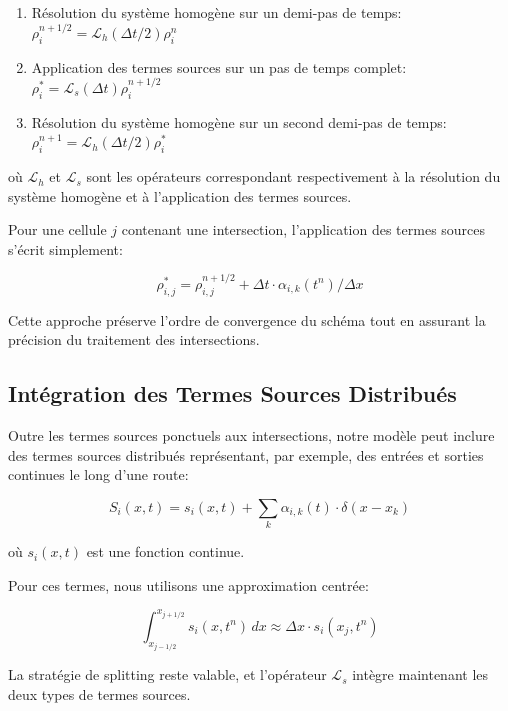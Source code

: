 \begin{enumerate}
\item Résolution du système homogène sur un demi-pas de temps: $\rho_i^{n+1/2} = \mathcal{L}_h(\Delta t/2) \rho_i^n$
\item Application des termes sources sur un pas de temps complet: $\rho_i^{*} = \mathcal{L}_s(\Delta t) \rho_i^{n+1/2}$
\item Résolution du système homogène sur un second demi-pas de temps: $\rho_i^{n+1} = \mathcal{L}_h(\Delta t/2) \rho_i^{*}$
\end{enumerate}

où $\mathcal{L}_h$ et $\mathcal{L}_s$ sont les opérateurs correspondant respectivement à la résolution du système homogène et à l'application des termes sources.

Pour une cellule $j$ contenant une intersection, l'application des termes sources s'écrit simplement:

\begin{equation}
\rho_{i,j}^{*} = \rho_{i,j}^{n+1/2} + \Delta t \cdot \alpha_{i,k}(t^n) / \Delta x
\end{equation}

Cette approche préserve l'ordre de convergence du schéma tout en assurant la précision du traitement des intersections.

\subsection{Intégration des Termes Sources Distribués}
\label{subsec:termes_sources}

Outre les termes sources ponctuels aux intersections, notre modèle peut inclure des termes sources distribués représentant, par exemple, des entrées et sorties continues le long d'une route:

\begin{equation}
S_i(x,t) = s_i(x,t) + \sum_k \alpha_{i,k}(t) \cdot \delta(x-x_k)
\end{equation}

où $s_i(x,t)$ est une fonction continue.

Pour ces termes, nous utilisons une approximation centrée:

\begin{equation}
\int_{x_{j-1/2}}^{x_{j+1/2}} s_i(x,t^n) \, dx \approx \Delta x \cdot s_i(x_j, t^n)
\end{equation}

La stratégie de splitting reste valable, et l'opérateur $\mathcal{L}_s$ intègre maintenant les deux types de termes sources.

